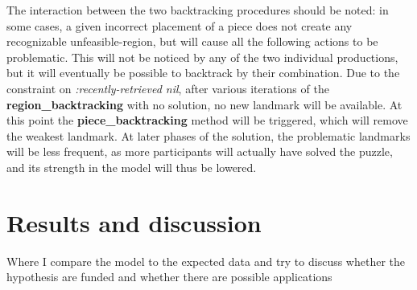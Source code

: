 \documentclass[a4paper,singleside,12pt]{report} %
\begin{document}
	The interaction between the two backtracking procedures should be noted: in some cases, a given incorrect placement of a piece does not create any recognizable unfeasible-region, but will cause all the following actions to be problematic. This will not be noticed by any of the two individual productions, but it will eventually be possible to backtrack by their combination. Due to the constraint on \textit{:recently-retrieved nil}, after various iterations of the \textbf{region\_backtracking} with no solution, no new landmark will be available. At this point the \textbf{piece\_backtracking} method will be triggered, which will remove the weakest landmark. At later phases of the solution, the problematic landmarks will be less frequent, as more participants will actually have solved the puzzle, and its strength in the model will thus be lowered.
  
	
	\chapter{Results and discussion}
    Where I compare the model to the expected data and try to discuss whether the hypothesis are funded
    and whether there are possible applications
	
	
	\appendix
	
	\printbibliography[heading=bibintoc] %

	
	\acknowledgements
		
		
\end{document}
